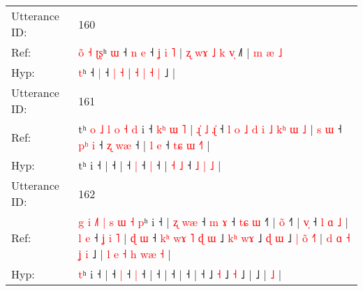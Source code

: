 \documentclass[10pt]{article}
\DeclareRobustCommand{\hl}[1]{{\textcolor{red}{#1}}}
\begin{document}
\begin{longtable}{ll}
 \\
\midrule
Utterance ID: & 160 \\
Ref: & \hl{o}\hl{̃}\hl{ }\hl{˧}\hl{ }\hl{ʈ}\hl{ʂ}ʰ\hl{ }\hl{ɯ} ˧\hl{ }\hl{n} \hl{e} ˧\hl{ }\hl{ʝ} \hl{i} \hl{˥} |\hl{ }\hl{ʐ} \hl{w}\hl{ɤ} \hl{˩} \hl{k} \hl{v}\hl{̩} ˩\hl{˥} |\hl{ }\hl{m}\hl{ }\hl{æ}\hl{ }\hl{˩}
 \\
Hyp: & \hl{}\hl{}\hl{}\hl{}\hl{}\hl{}\hl{t}ʰ\hl{}\hl{} ˧\hl{}\hl{} \hl{|} ˧\hl{}\hl{} \hl{|} \hl{˧} |\hl{}\hl{} \hl{}\hl{˧} \hl{|} \hl{˧} \hl{}\hl{|} ˩\hl{} |\hl{}\hl{}\hl{}\hl{}\hl{}\hl{}
 \\
\midrule
Utterance ID: & 161 \\
Ref: & tʰ\hl{ }\hl{o}\hl{ }\hl{˩}\hl{ }\hl{l}\hl{ }\hl{o}\hl{ }\hl{˧}\hl{ }\hl{d} i ˧\hl{ }\hl{k}\hl{ʰ}\hl{ }\hl{ɯ}\hl{ }\hl{˥} |\hl{ }\hl{ɻ}\hl{̍}\hl{ }\hl{˩}\hl{ }\hl{ɻ}\hl{̍} ˧\hl{ }\hl{l}\hl{ }\hl{o}\hl{ }\hl{˩}\hl{ }\hl{d}\hl{ }\hl{i}\hl{ }\hl{˩}\hl{ }\hl{k}\hl{ʰ}\hl{ }\hl{ɯ}\hl{ }\hl{˩} |\hl{ }\hl{s}\hl{ }\hl{ɯ} ˧\hl{ }\hl{p}\hl{ʰ} \hl{i} ˧\hl{ }\hl{ʐ} \hl{w}\hl{æ} ˧ | \hl{l} \hl{e} ˧ \hl{t}\hl{ɕ} \hl{ɯ} \hl{˧}\hl{˥} |
 \\
Hyp: & tʰ\hl{}\hl{}\hl{}\hl{}\hl{}\hl{}\hl{}\hl{}\hl{}\hl{}\hl{}\hl{} i ˧\hl{}\hl{}\hl{}\hl{}\hl{}\hl{}\hl{} |\hl{}\hl{}\hl{}\hl{}\hl{}\hl{}\hl{}\hl{} ˧\hl{}\hl{}\hl{}\hl{}\hl{}\hl{}\hl{}\hl{}\hl{}\hl{}\hl{}\hl{}\hl{}\hl{}\hl{}\hl{}\hl{}\hl{}\hl{} |\hl{}\hl{}\hl{}\hl{} ˧\hl{}\hl{}\hl{} \hl{|} ˧\hl{}\hl{} \hl{}\hl{|} ˧ | \hl{˧} \hl{˩} ˧ \hl{}\hl{˩} \hl{|} \hl{}\hl{˩} |
 \\
\midrule
Utterance ID: & 162 \\
Ref: & \hl{g}\hl{ }\hl{i}\hl{ }\hl{˩}\hl{˥}\hl{ }\hl{|}\hl{ }\hl{s}\hl{ }\hl{ɯ}\hl{ }\hl{˧}\hl{ }\hl{p}ʰ i ˧ |\hl{ }\hl{ʐ}\hl{ }\hl{w}\hl{æ} ˧\hl{ }\hl{m} \hl{ɤ} ˧\hl{ }\hl{t}\hl{ɕ} \hl{ɯ} ˧\hl{˥} |\hl{ }\hl{o}\hl{̃} ˧\hl{˥} |\hl{ }\hl{v}\hl{̩} ˧\hl{ }\hl{l}\hl{ }\hl{ɑ}\hl{ }\hl{˩} |\hl{ }\hl{l}\hl{ }\hl{e} ˧\hl{ }\hl{ʝ}\hl{ }\hl{i}\hl{ }\hl{˥} |\hl{ }\hl{ɖ}\hl{ }\hl{ɯ} ˧\hl{ }\hl{k}\hl{ʰ}\hl{ }\hl{w}\hl{ɤ}\hl{ }\hl{˥}\hl{ }\hl{ɖ}\hl{ }\hl{ɯ} ˩\hl{ }\hl{k}\hl{ʰ} \hl{w}\hl{ɤ} ˩\hl{ }\hl{ɖ} \hl{ɯ} ˩\hl{ }\hl{|}\hl{ }\hl{o}\hl{̃}\hl{ }\hl{˧}\hl{˥} |\hl{ }\hl{d}\hl{ }\hl{ɑ}\hl{ }\hl{˧}\hl{ }\hl{ʝ}\hl{ }\hl{i} ˩ |\hl{ }\hl{l}\hl{ }\hl{e}\hl{ }\hl{˧}\hl{ }\hl{h}\hl{ }\hl{w}\hl{æ} \hl{˧} |
 \\
Hyp: & \hl{}\hl{}\hl{}\hl{}\hl{}\hl{}\hl{}\hl{}\hl{}\hl{}\hl{}\hl{}\hl{}\hl{}\hl{}\hl{t}ʰ i ˧ |\hl{}\hl{}\hl{}\hl{}\hl{} ˧\hl{}\hl{} \hl{|} ˧\hl{}\hl{}\hl{} \hl{|} ˧\hl{} |\hl{}\hl{}\hl{} ˧\hl{} |\hl{}\hl{}\hl{} ˧\hl{}\hl{}\hl{}\hl{}\hl{}\hl{} |\hl{}\hl{}\hl{}\hl{} ˧\hl{}\hl{}\hl{}\hl{}\hl{}\hl{} |\hl{}\hl{}\hl{}\hl{} ˧\hl{}\hl{}\hl{}\hl{}\hl{}\hl{}\hl{}\hl{}\hl{}\hl{}\hl{}\hl{} ˩\hl{}\hl{}\hl{} \hl{}\hl{˧} ˩\hl{}\hl{} \hl{˧} ˩\hl{}\hl{}\hl{}\hl{}\hl{}\hl{}\hl{}\hl{} |\hl{}\hl{}\hl{}\hl{}\hl{}\hl{}\hl{}\hl{}\hl{}\hl{} ˩ |\hl{}\hl{}\hl{}\hl{}\hl{}\hl{}\hl{}\hl{}\hl{}\hl{}\hl{} \hl{˩} |

\end{longtable}
\end{document}
